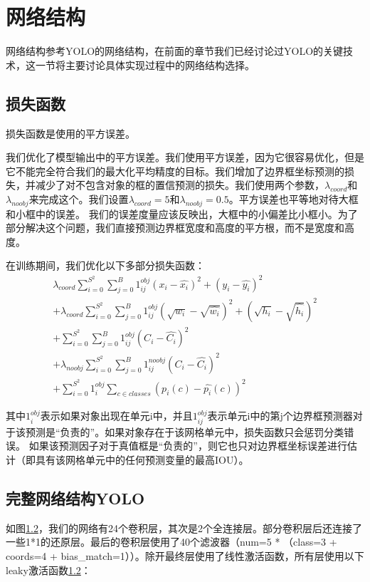 \section{网络结构}{
网络结构参考YOLO的网络结构，在前面的章节我们已经讨论过YOLO的关键技术，这一节将主要讨论具体实现过程中的网络结构选择。

\subsection{损失函数}{
	损失函数是使用的平方误差。

	我们优化了模型输出中的平方误差。我们使用平方误差，因为它很容易优化，但是它不能完全符合我们的最大化平均精度的目标。我们增加了边界框坐标预测的损失，并减少了对不包含对象的框的置信预测的损失。我们使用两个参数，$\lambda_{coord}$和$\lambda_{noobj}$来完成这个。我们设置$\lambda_{coord}=5$和$\lambda_{noobj}=0.5$。平方误差也平等地对待大框和小框中的误差。 我们的误差度量应该反映出，大框中的小偏差比小框小。为了部分解决这个问题，我们直接预测边界框宽度和高度的平方根，而不是宽度和高度。

	在训练期间，我们优化以下多部分损失函数：
	\begin{eqnarray*}
	\lambda_{coord} \sum_{i=0}^{S^2} \sum_{j=0}^B 1_{ij}^{obj} (x_i - \hat{x_i})^2 + (y_i - \hat{y_i})^2 \\
	+ \lambda_{coord} \sum_{i=0}^{S^2} \sum_{j=0}^B 1_{ij}^{obj} (\sqrt{w_i} - \sqrt{\hat{w_i}})^2 + (\sqrt{h_i} - \sqrt{\hat{h_i}})^2 \\
	+ \sum_{i=0}^{S^2} \sum_{j=0}^B 1_{ij}^{obj} (C_i - \hat{C_i})^2 \\
	+ \lambda_{noobj} \sum_{i=0}^{S^2} \sum_{j=0}^B 1_{ij}^{noobj} (C_i - \hat{C_i})^2 \\
	+ \sum_{i=0}^{S^2} 1_{i}^{obj} \sum_{c \in classes} (p_i(c) - \hat{p_i}(c))^2
	\end{eqnarray*}

	其中$1_i^{obj}$表示如果对象出现在单元i中，并且$1_{ij}^{obj}$表示单元i中的第j个边界框预测器对于该预测是“负责的”。如果对象存在于该网格单元中，损失函数只会惩罚分类错误。 如果该预测因子对于真值框是“负责的”，则它也只对边界框坐标误差进行估计（即具有该网格单元中的任何预测变量的最高IOU）。
}

\subsection{完整网络结构YOLO}{
	如图\ref{}，我们的网络有24个卷积层，其次是2个全连接层。部分卷积层后还连接了一些1*1的还原层。最后的卷积层使用了40个滤波器（num=5 * （class=3 + coords=4 + bias\_match=1））。除开最终层使用了线性激活函数，所有层使用以下leaky激活函数\ref{}：

}}

